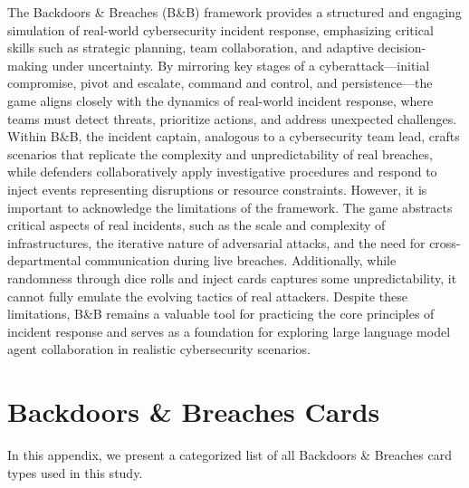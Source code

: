 \documentclass[letterpaper]{article} %
\begin{document}
The Backdoors \& Breaches (B\&B) framework provides a structured and engaging simulation of real-world cybersecurity incident response, emphasizing critical skills such as strategic planning, team collaboration, and adaptive decision-making under uncertainty. By mirroring key stages of a cyberattack—initial compromise, pivot and escalate, command and control, and persistence—the game aligns closely with the dynamics of real-world incident response, where teams must detect threats, prioritize actions, and address unexpected challenges. Within B\&B, the incident captain, analogous to a cybersecurity team lead, crafts scenarios that replicate the complexity and unpredictability of real breaches, while defenders collaboratively apply investigative procedures and respond to inject events representing disruptions or resource constraints. However, it is important to acknowledge the limitations of the framework. The game abstracts critical aspects of real incidents, such as the scale and complexity of infrastructures, the iterative nature of adversarial attacks, and the need for cross-departmental communication during live breaches. Additionally, while randomness through dice rolls and inject cards captures some unpredictability, it cannot fully emulate the evolving tactics of real attackers. Despite these limitations, B\&B remains a valuable tool for practicing the core principles of incident response and serves as a foundation for exploring large language model agent collaboration in realistic cybersecurity scenarios.

\section{Backdoors \& Breaches Cards}
\label{sec:bnb-cards}

In this appendix, we present a categorized list of all Backdoors \& Breaches card types used in this study.
\end{document}
